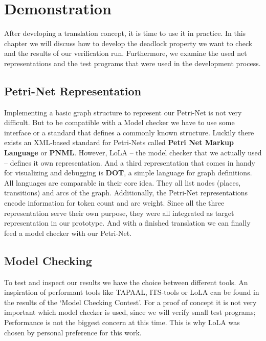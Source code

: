 \chapter{Demonstration}
\label{results}
After developing a translation concept, it is time to use it in practice.
In this chapter we will discuss how to develop the deadlock property we want to check and the results of our verification run.
Furthermore, we examine the used net representations and the test programs that were used in the development process.

\section{Petri-Net Representation}
\label{app_petri}
Implementing a basic graph structure to represent our Petri-Net is not very difficult.
But to be compatible with a Model checker we have to use some interface or a standard that
defines a commonly known structure.
Luckily there exists an XML-based standard for Petri-Nets called \textbf{Petri Net Markup Language}\cite{pnml}\cite{kindler2006petri} or \textbf{PNML}.
However, LoLA -- the model checker that we actually used -- defines it own representation.
And a third representation that comes in handy for visualizing and debugging is \textbf{DOT}\cite{koutsofios1996drawing}, a simple language for graph definitions.
All languages are comparable in their core idea.
They all list nodes (places, transitions) and arcs of the graph. 
Additionally, the Petri-Net representations encode information for token count and arc weight.
Since all the three representation serve their own purpose, they were all integrated as target representation in our prototype.
And with a finished translation we can finally feed a model checker with our Petri-Net.

\section{Model Checking}
\label{app_mc}
To test and inspect our results we have the choice between different tools.
An inspiration of performant tools like TAPAAL\cite{tapaal}, ITS-tools\cite{its-tools} or LoLA\cite{lola}\cite{schmidt2000lola} can be found in the results of the `Model Checking Contest'\cite{mcc}.
For a proof of concept it is not very important which model checker is used, since we will verify small test programs;
Performance is not the biggest concern at this time.
This is why LoLA was chosen by personal preference for this work.

